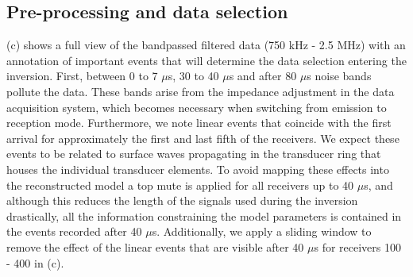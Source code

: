 \documentclass[12pt]{iopart}
\begin{document}
\subsection{Pre-processing and data selection}
(c) shows a full view of the bandpassed filtered data (750 kHz - 2.5 MHz) with an annotation of important events that will determine the data selection entering the inversion. First, between 0 to 7 $\mu$s, 30 to 40 $\mu$s and after 80 $\mu$s noise bands pollute the data. These bands arise from the impedance adjustment in the data acquisition system, which becomes necessary when switching from emission to reception mode. Furthermore, we note linear events that coincide with the first arrival for approximately the first and last fifth of the receivers. We expect these events to be related to surface waves propagating in the transducer ring that houses the individual transducer elements. To avoid mapping these effects into the reconstructed model a top mute is applied for all receivers up to 40 $\mu$s, and although this reduces the length of the signals used during the inversion drastically, all the information constraining the model parameters is contained in the events recorded after 40 $\mu$s. Additionally, we apply a sliding window to remove the effect of the linear events that are visible after 40 $\mu$s for receivers 100 - 400 in (c).  
\end{document}
